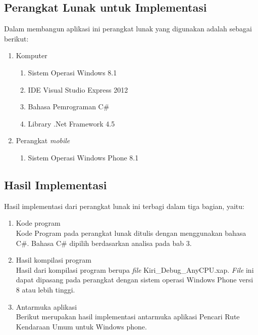 \subsection{Perangkat Lunak untuk Implementasi}
\label{lab:Perangkat Lunak untuk Implementasi}
\hspace{0.5cm} Dalam membangun aplikasi ini perangkat lunak yang digunakan adalah sebagai berikut:
\begin{enumerate}
	\item Komputer
		\begin{enumerate}
			\item Sistem Operasi Windows 8.1
			\item IDE Visual Studio Express 2012
			\item Bahasa Pemrograman C\#
			\item Library .Net Framework 4.5
		\end{enumerate}
		
	\item Perangkat \textit{mobile}
		\begin{enumerate}
			\item Sistem Operasi Windows Phone 8.1
		\end{enumerate}
\end{enumerate}

\subsection{Hasil Implementasi}
\label{lab:Hasil Implementasi}
\hspace{0.5cm} Hasil implementasi dari perangkat lunak ini terbagi dalam tiga bagian, yaitu:
\begin{enumerate}
	\item Kode program \\
	Kode Program pada perangkat lunak ditulis dengan menggunakan bahasa C\#. Bahasa C\# dipilih berdasarkan analisa pada bab 3.
	\item Hasil kompilasi program \\
	Hasil dari kompilasi program berupa \textit{file} Kiri\_Debug\_AnyCPU.xap. \textit{File} ini dapat dipasang pada perangkat dengan sistem operasi Windows Phone versi 8 atau lebih tinggi.
	\item Antarmuka aplikasi \\
	Berikut merupakan hasil implementasi antarmuka aplikasi Pencari Rute Kendaraan Umum untuk Windows phone.
\end{enumerate}

